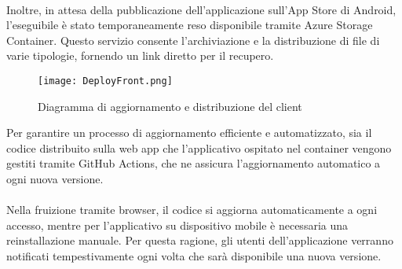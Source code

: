 \\
Inoltre, in attesa della pubblicazione dell’applicazione sull’App Store di Android, l’eseguibile è stato temporaneamente reso disponibile tramite Azure Storage Container.
Questo servizio consente l’archiviazione e la distribuzione di file di varie tipologie, fornendo un link diretto per il recupero.
\clearpage
\begin{figure}[h!]
    \begin{center}
        \texttt{[image: DeployFront.png]}
        \caption{Diagramma di aggiornamento e distribuzione del client}
    \end{center}
\end{figure}

Per garantire un processo di aggiornamento efficiente e automatizzato,
sia il codice distribuito sulla web app che l’applicativo ospitato nel container vengono gestiti tramite GitHub Actions,
che ne assicura l’aggiornamento automatico a ogni nuova versione. \\
\\

Nella fruizione tramite browser, il codice si aggiorna automaticamente a ogni accesso, mentre per l’applicativo su dispositivo mobile è necessaria una reinstallazione manuale.
Per questa ragione, gli utenti dell’applicazione verranno notificati tempestivamente ogni volta che sarà disponibile una nuova versione.
\clearpage
